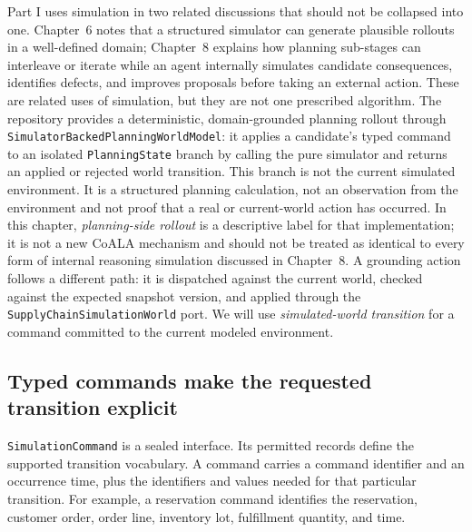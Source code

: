 Part I uses simulation in two related discussions that should not be collapsed into one. Chapter~6 notes that a structured simulator can generate plausible rollouts in a well-defined domain; Chapter~8 explains how planning sub-stages can interleave or iterate while an agent internally simulates candidate consequences, identifies defects, and improves proposals before taking an external action. These are related uses of simulation, but they are not one prescribed algorithm. The repository provides a deterministic, domain-grounded planning rollout through \texttt{SimulatorBackedPlanningWorldModel}: it applies a candidate's typed command to an isolated \texttt{PlanningState} branch by calling the pure simulator and returns an applied or rejected world transition. This branch is not the current simulated environment. It is a structured planning calculation, not an observation from the environment and not proof that a real or current-world action has occurred. In this chapter, \emph{planning-side rollout} is a descriptive label for that implementation; it is not a new CoALA mechanism and should not be treated as identical to every form of internal reasoning simulation discussed in Chapter~8. A grounding action follows a different path: it is dispatched against the current world, checked against the expected snapshot version, and applied through the \texttt{SupplyChain\allowbreak{}SimulationWorld} port. We will use \emph{simulated-world transition} for a command committed to the current modeled environment.

\subsection{Typed commands make the requested transition explicit}

\texttt{SimulationCommand} is a sealed interface. Its permitted records define the supported transition vocabulary. A command carries a command identifier and an occurrence time, plus the identifiers and values needed for that particular transition. For example, a reservation command identifies the reservation, customer order, order line, inventory lot, fulfillment quantity, and time.

